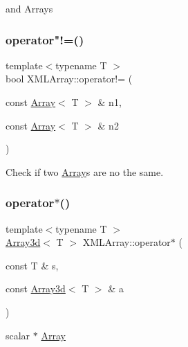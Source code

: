 and Arrays 

\mbox{\label{namespaceXMLArray_a1cfa3f5a98b382e585af567e51479053}} 
\subsubsection{\texorpdfstring{operator"!=()}{operator!=()}}
{\footnotesize\ttfamily template$<$typename T $>$ \\
bool X\+M\+L\+Array\+::operator!= (\begin{DoxyParamCaption}\item[{const \mbox{\hyperlink{classXMLArray_1_1Array}{Array}}$<$ T $>$ \&}]{n1,  }\item[{const \mbox{\hyperlink{classXMLArray_1_1Array}{Array}}$<$ T $>$ \&}]{n2 }\end{DoxyParamCaption})\hspace{0.3cm}{\ttfamily [inline]}}



Check if two \mbox{\hyperlink{classXMLArray_1_1Array}{Array}}\textquotesingle{}s are no the same. 

\mbox{\label{namespaceXMLArray_a09c6c9bdce753a6c7ccd4efbdda02e23}} 
\subsubsection{\texorpdfstring{operator$\ast$()}{operator*()}\hspace{0.1cm}{\footnotesize\ttfamily [1/5]}}
{\footnotesize\ttfamily template$<$typename T $>$ \\
\mbox{\hyperlink{classXMLArray_1_1Array3d}{Array3d}}$<$ T $>$ X\+M\+L\+Array\+::operator$\ast$ (\begin{DoxyParamCaption}\item[{const T \&}]{s,  }\item[{const \mbox{\hyperlink{classXMLArray_1_1Array3d}{Array3d}}$<$ T $>$ \&}]{a }\end{DoxyParamCaption})\hspace{0.3cm}{\ttfamily [inline]}}



scalar $\ast$ \mbox{\hyperlink{classXMLArray_1_1Array}{Array}} 

